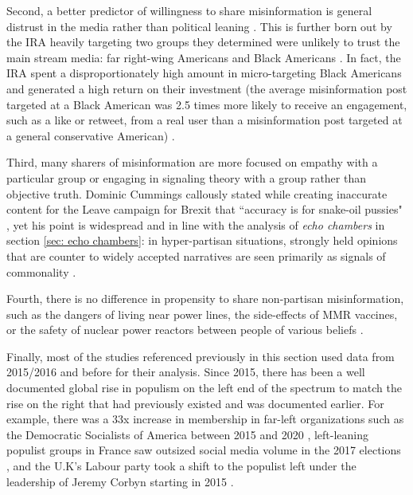 \documentclass[preprint,review,12pt]{elsarticle}
\begin{document}
Second, a better predictor of willingness to share misinformation is general distrust in the media rather than political leaning \cite{hopp2020people,shin2017partisan,kahan2012ideology,lewandowsky2016motivated,swire2017processing,mourao2019fake}. This is further born out by the IRA heavily targeting two groups they determined were unlikely to trust the main stream media: far right-wing Americans and Black Americans \cite{diresta2019tactics,howard2019ira,boatwright2018troll,jamieson2020cyberwar,mueller2019mueller,freelon2020black}. In fact, the IRA spent a disproportionately high amount in micro-targeting Black Americans and generated a high return on their investment (the average misinformation post targeted at a Black American was 2.5 times more likely to receive an engagement, such as a like or retweet, from a real user than a misinformation post targeted at a general conservative American) \cite{howard2019ira,freelon2020black}.

Third, many sharers of misinformation are more focused on empathy with a particular group \cite{winter2015they,rheault2016measuring,dale2017nlp} or engaging in signaling theory with a group \cite{connelly2011signaling,lampe2007familiar,spence2002signaling} rather than objective truth. Dominic Cummings callously stated while creating inaccurate content for the Leave campaign for Brexit that ``accuracy is for snake-oil pussies" \cite{crace2016accuracy}, yet his point is widespread and in line with the analysis of \textit{echo chambers} in section \ref{sec: echo chambers}: in hyper-partisan situations, strongly held opinions that are counter to widely accepted narratives are seen primarily as signals of commonality \cite{yla2018populist,noppari2019user,lazer2018science,yla2019politicization,wasilewski2019us,freelon2020russian}. 


Fourth, there is no difference in propensity to share non-partisan misinformation, such as the dangers of living near power lines, the side-effects of MMR vaccines, or the safety of nuclear power reactors between people of various beliefs \cite{kahan2015climate,hara2016co,kahan2012ideology,lewandowsky2016motivated,barbera2015tweeting}.

Finally, most of the studies referenced previously in this section used data from 2015/2016 and before for their analysis. Since 2015, there has been a well documented global rise in populism on the left end of the spectrum to match the rise on the right that had previously existed and was documented earlier. For example, there was a 33x increase in membership in far-left organizations such as the Democratic Socialists of America between 2015 and 2020 \cite{godfrey2020thousands}, left-leaning populist groups in France saw outsized social media volume in the 2017 elections \cite{donadio2017french}, and the U.K's Labour party took a shift to the populist left under the leadership of Jeremy Corbyn starting in 2015 \cite{wainwright2018remarkable,hobson_fielding_2019}. 
\end{document}
